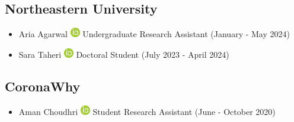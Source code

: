 \documentclass[10pt,a4paper,sans]{moderncv} %
\begin{document}
    \subsection{Northeastern University}
        \begin{itemize}
        \item     Aria Agarwal {\scriptsize     \href{https://orcid.org/0009-0008-1788-6318}{\includegraphics[scale=0.5]{img/ORCIDiD_icon16x16}}
}    Undergraduate Research Assistant (January - May 2024)

        \item     Sara Taheri {\scriptsize     \href{https://orcid.org/0000-0002-6554-9083}{\includegraphics[scale=0.5]{img/ORCIDiD_icon16x16}}
}    Doctoral Student (July 2023 - April 2024)

        \end{itemize}
    \subsection{CoronaWhy}
        \begin{itemize}
        \item     Aman Choudhri {\scriptsize     \href{https://orcid.org/0000-0003-4963-6651}{\includegraphics[scale=0.5]{img/ORCIDiD_icon16x16}}
}    Student Research Assistant (June - October 2020)

        \end{itemize}
\end{document}
